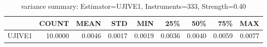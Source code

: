 \begin{table}[ht]
\centering
\caption{variance summary: Estimator=UJIVE1, Instruments=333, Strength=0.40}
\begin{tabular}{lrrrrrrrr}
\toprule
 & COUNT & MEAN & STD & MIN & 25\% & 50\% & 75\% & MAX \\
\midrule
UJIVE1 & 10.0000 & 0.0046 & 0.0017 & 0.0019 & 0.0036 & 0.0040 & 0.0059 & 0.0077 \\
\bottomrule
\end{tabular}
\end{table}
